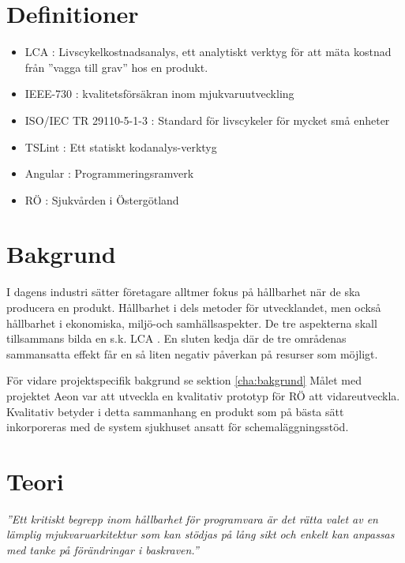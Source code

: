 \section{Definitioner}
\begin{itemize}
	\item LCA :  Livscykelkostnadsanalys, ett analytiskt verktyg för att mäta kostnad från ''vagga till grav'' hos en produkt.
	\item IEEE-730 : kvalitetsförsäkran inom mjukvaruutveckling
	\item ISO/IEC TR 29110-5-1-3 : Standard för livscykeler för mycket små enheter
	\item TSLint : Ett statiskt kodanalys-verktyg
	\item Angular : Programmeringsramverk
	\item RÖ : Sjukvården i Östergötland
\end{itemize}

\section{Bakgrund}
I dagens industri sätter företagare alltmer fokus på hållbarhet när de ska producera en produkt. Hållbarhet i dels metoder för utvecklandet, men också hållbarhet i ekonomiska, miljö-och samhällsaspekter.
De tre aspekterna skall tillsammans bilda en s.k. LCA \cite{LCA}. En sluten kedja där de tre områdenas sammansatta effekt får en så liten negativ påverkan på resurser som möjligt.

För vidare projektspecifik bakgrund se sektion \ref{cha:bakgrund}
Målet med projektet Aeon var att utveckla en kvalitativ prototyp för RÖ att vidareutveckla. Kvalitativ betyder i detta sammanhang en produkt som på bästa sätt inkorporeras med de system sjukhuset ansatt för schemaläggningsstöd.

\section{Teori}

\vspace{0.5em}
\begin{minipage}{1\linewidth}
\begin{center}

\emph{''Ett kritiskt begrepp inom hållbarhet för programvara är det rätta valet av en lämplig mjukvaruarkitektur som kan stödjas på lång sikt och enkelt kan anpassas med tanke på förändringar i baskraven.''} \cite{sustainable}

\end{center}
\end{minipage}

